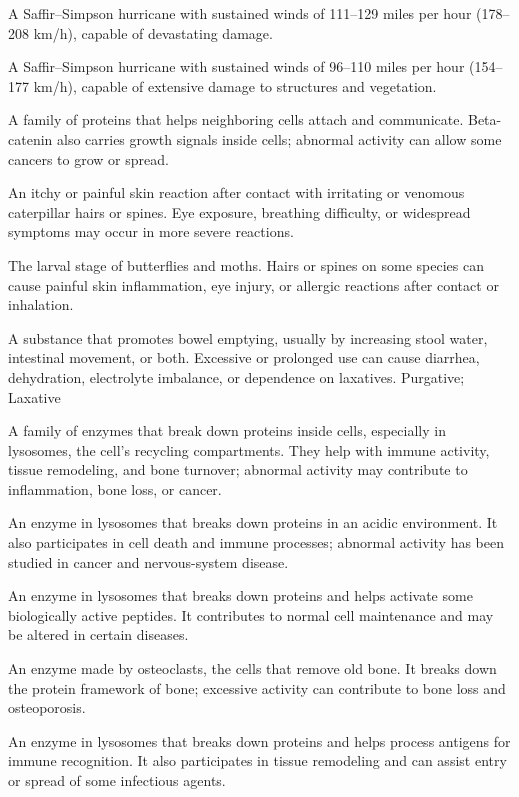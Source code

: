  A Saffir--Simpson hurricane with sustained winds of 111--129 miles per hour (178--208 km/h), capable of devastating damage.

 A Saffir--Simpson hurricane with sustained winds of 96--110 miles per hour (154--177 km/h), capable of extensive damage to structures and vegetation.

 A family of proteins that helps neighboring cells attach and communicate. Beta-catenin also carries growth signals inside cells; abnormal activity can allow some cancers to grow or spread.

 An itchy or painful skin reaction after contact with irritating or venomous caterpillar hairs or spines. Eye exposure, breathing difficulty, or widespread symptoms may occur in more severe reactions.

 The larval stage of butterflies and moths. Hairs or spines on some species can cause painful skin inflammation, eye injury, or allergic reactions after contact or inhalation.

 A substance that promotes bowel emptying, usually by increasing stool water, intestinal movement, or both. Excessive or prolonged use can cause diarrhea, dehydration, electrolyte imbalance, or dependence on laxatives.
\synonyms
Purgative; Laxative

 A family of enzymes that break down proteins inside cells, especially in lysosomes, the cell's recycling compartments. They help with immune activity, tissue remodeling, and bone turnover; abnormal activity may contribute to inflammation, bone loss, or cancer.

 An enzyme in lysosomes that breaks down proteins in an acidic environment. It also participates in cell death and immune processes; abnormal activity has been studied in cancer and nervous-system disease.

 An enzyme in lysosomes that breaks down proteins and helps activate some biologically active peptides. It contributes to normal cell maintenance and may be altered in certain diseases.

 An enzyme made by osteoclasts, the cells that remove old bone. It breaks down the protein framework of bone; excessive activity can contribute to bone loss and osteoporosis.

 An enzyme in lysosomes that breaks down proteins and helps process antigens for immune recognition. It also participates in tissue remodeling and can assist entry or spread of some infectious agents.

